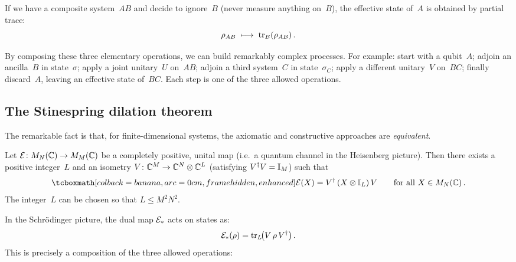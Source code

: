 If we have a composite system~$AB$ and decide to ignore~$B$
(never measure anything on~$B$), the effective state of~$A$ is
obtained by partial trace:
\begin{equation}\label{eq:reduce-op}
  \rho_{AB} \;\longmapsto\; \operatorname{tr}_B(\rho_{AB})\,.
\end{equation}

\begin{intuition}
  By composing these three elementary operations, we can build
  remarkably complex processes.  For example: start with a
  qubit~$A$; adjoin an ancilla~$B$ in state~$\sigma$; apply a
  joint unitary~$U$ on~$AB$; adjoin a third system~$C$ in
  state~$\sigma_C$; apply a different unitary~$V$ on~$BC$;
  finally discard~$A$, leaving an effective state of~$BC$.  Each
  step is one of the three allowed operations.
\end{intuition}

\subsection{The Stinespring dilation theorem}%
\label{sec:stinespring}

The remarkable fact is that, for finite-dimensional systems, the
axiomatic and constructive approaches are \emph{equivalent}.

\begin{theorem}\label{thm:stinespring}
  Let $\mathcal{E}\colon M_{N}(\mathbb{C}) \to M_{M}(\mathbb{C})$ be a completely positive, unital
  map (i.e.\ a quantum channel in the Heisenberg picture).  Then there
  exists a positive integer~$L$ and an isometry
  $V\colon \mathbb{C}^M \to \mathbb{C}^N \otimes \mathbb{C}^L$ (satisfying $V^\dagger V = \mathbb{I}_M$)
  such that
  \begin{equation}\label{eq:stinespring}
    \eqbox{\chan(X) = V^\adj\,(X \tp \One_L)\,V}
    \qquad \text{for all } X \in \Mn{N}\,.
  \end{equation}
  The integer~$L$ can be chosen so that $L \leq M^2 N^2$.
\end{theorem}

In the Schr\"odinger picture, the dual map $\mathcal{E}_*$ acts on states as:
\begin{equation}\label{eq:stinespring-schrodinger}
  \mathcal{E}_*(\rho) = \operatorname{tr}_L\!\bigl(V\,\rho\, V^\dagger\bigr)\,.
\end{equation}
This is precisely a composition of the three allowed operations:

